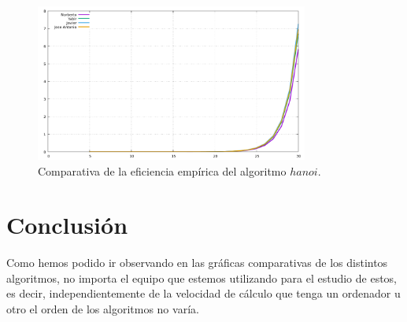 \documentclass[11pt,a4paper]{article}
\begin{document}
\begin{figure}[H]
	\centering
	\includegraphics[width=0.8\textwidth]{../plots/hanoi}
	\caption{Comparativa de la eficiencia empírica del algoritmo $hanoi$.}
\end{figure}

\section{Conclusión}

Como hemos podido ir observando en las gráficas comparativas de los distintos algoritmos,
no importa el equipo que estemos utilizando para el estudio de estos, es decir,
independientemente de la velocidad de cálculo que tenga un ordenador u otro
el orden de los algoritmos no varía.
\end{document}

